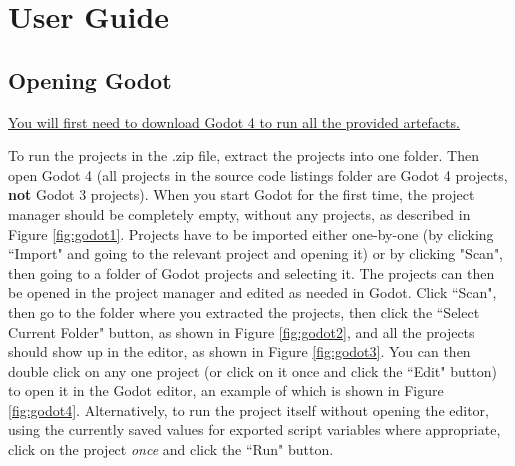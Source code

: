 \chapter{User Guide} \label{Guide}

\section{Opening Godot}

\href{https://www.godotengine.org/download/}{You will first need to download Godot 4 to run all the provided artefacts.} 

To run the projects in the .zip file, extract the projects into one folder. Then open Godot 4 (all projects in the source code listings folder are Godot 4 projects, \textbf{not} Godot 3 projects). When you start Godot for the first time, the project manager should be completely empty, without any projects, as described in Figure \ref{fig:godot1}. Projects have to be imported either one-by-one (by clicking ``Import" and going to the relevant project and opening it) or by clicking "Scan", then going to a folder of Godot projects and selecting it. The projects can then be opened in the project manager and edited as needed in Godot. Click ``Scan", then go to the folder where you extracted the projects, then click the ``Select Current Folder" button, as shown in Figure \ref{fig:godot2}, and all the projects should show up in the editor, as shown in Figure \ref{fig:godot3}. You can then double click on any one project (or click on it once and click the ``Edit" button) to open it in the Godot editor, an example of which is shown in Figure \ref{fig:godot4}. Alternatively, to run the project itself without opening the editor, using the currently saved values for exported script variables where appropriate, click on the project \textit{once} and click the ``Run" button.

